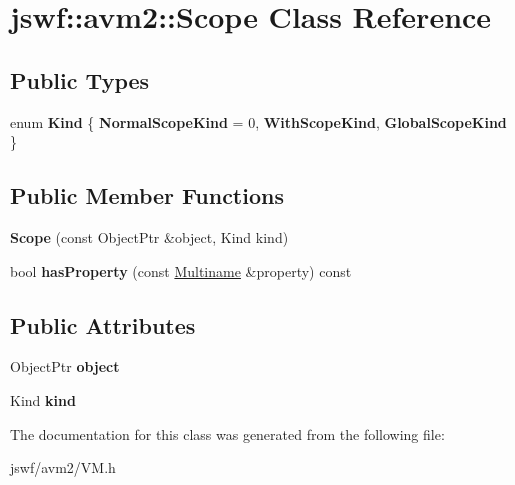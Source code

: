 \hypertarget{classjswf_1_1avm2_1_1_scope}{\section{jswf\+:\+:avm2\+:\+:Scope Class Reference}
\label{classjswf_1_1avm2_1_1_scope}
}
\subsection*{Public Types}
\begin{DoxyCompactItemize}
\item 
\hypertarget{classjswf_1_1avm2_1_1_scope_a6150e6c71a1976a3883f34a1a780e10a}{enum {\bfseries Kind} \{ {\bfseries Normal\+Scope\+Kind} = 0, 
{\bfseries With\+Scope\+Kind}, 
{\bfseries Global\+Scope\+Kind}
 \}}\label{classjswf_1_1avm2_1_1_scope_a6150e6c71a1976a3883f34a1a780e10a}

\end{DoxyCompactItemize}
\subsection*{Public Member Functions}
\begin{DoxyCompactItemize}
\item 
\hypertarget{classjswf_1_1avm2_1_1_scope_add5c568d394292e83d48c38d6423b1d9}{{\bfseries Scope} (const Object\+Ptr \&object, Kind kind)}\label{classjswf_1_1avm2_1_1_scope_add5c568d394292e83d48c38d6423b1d9}

\item 
\hypertarget{classjswf_1_1avm2_1_1_scope_a926c07b142f9b2e0535310d35725a0c2}{bool {\bfseries has\+Property} (const \hyperlink{structjswf_1_1avm2_1_1_multiname}{Multiname} \&property) const }\label{classjswf_1_1avm2_1_1_scope_a926c07b142f9b2e0535310d35725a0c2}

\end{DoxyCompactItemize}
\subsection*{Public Attributes}
\begin{DoxyCompactItemize}
\item 
\hypertarget{classjswf_1_1avm2_1_1_scope_a121ce091a0782d38f644e1476285562c}{Object\+Ptr {\bfseries object}}\label{classjswf_1_1avm2_1_1_scope_a121ce091a0782d38f644e1476285562c}

\item 
\hypertarget{classjswf_1_1avm2_1_1_scope_a430ea3ce4c0116bc937c835c1ec7d9e6}{Kind {\bfseries kind}}\label{classjswf_1_1avm2_1_1_scope_a430ea3ce4c0116bc937c835c1ec7d9e6}

\end{DoxyCompactItemize}


The documentation for this class was generated from the following file\+:\begin{DoxyCompactItemize}
\item 
jswf/avm2/V\+M.\+h\end{DoxyCompactItemize}
